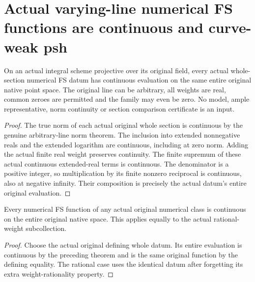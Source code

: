 \section{Actual varying-line numerical FS functions are continuous and curve-weak psh}
\label{sec:native-numerical-fs-continuity}

\begin{theorem}
\label{thm:native-numerical-fs-data-continuous}
\leanok
{}
On an actual integral scheme projective over its original field, every
actual whole-section numerical FS datum has continuous evaluation on the
same entire original native point space. The original line can be
arbitrary, all weights are real, common zeroes are permitted and the
family may even be zero. No model, ample representative, norm continuity
or section comparison certificate is an input.
\end{theorem}
\begin{proof}
The true norm of each actual original whole section is continuous by the
genuine arbitrary-line norm theorem. The inclusion into extended
nonnegative reals and the extended logarithm are continuous, including at
zero norm. Adding the actual finite real weight preserves continuity.
The finite supremum of these actual continuous extended-real terms is
continuous. The denominator is a positive integer, so multiplication by
its finite nonzero reciprocal is continuous, also at negative infinity.
Their composition is precisely the actual datum's entire original
evaluation.
\end{proof}

\begin{theorem}
\label{thm:native-numerical-fs-continuous}
\leanok
{}
Every numerical FS function of any actual original numerical class is
continuous on the entire original native space. This applies equally to
the actual rational-weight subcollection.
\end{theorem}
\begin{proof}
Choose the actual original defining whole datum. Its entire evaluation
is continuous by the preceding theorem and is the same original
function by the defining equality. The rational case uses the identical
datum after forgetting its extra weight-rationality property.
\end{proof}

